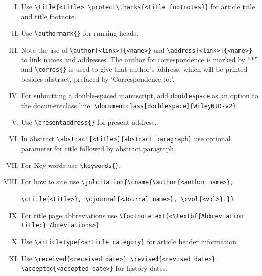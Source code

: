 \documentclass[ACS,STIX1COL]{WileyNJD-v2}
\begin{document}
\begin{enumerate}[(I).]

\item Use \verb"\title{<title> \protect\thanks{<title footnotes}}" for article title and title footnote.
\item Use \verb"\authormark{}" for running heads.

\item Note the use of \verb"\author[<link>]{<name>}" and \verb"\address[<link>]{<name>}" to
link names and addresses. The author for correspondence is marked
by ``*'' and \verb"\corres{}" is used to give that
author's address, which will be printed besides abstract, prefaced by
`Correspondence to:'.

\item For submitting a double-spaced manuscript, add
\verb"doublespace" as an option to the documentclass line. \verb"\documentclass[doublespace]{WileyNJD-v2}"

\item Use \verb"\presentaddress{}" for present address.

\item In abstract \verb"\abstract[<title>]{abstract paragraph}" use optional parameter for title followed by abstract paragraph.

\item For Key words use \verb"\keywords{}".

\item For how to site use \verb"\jnlcitation{\cname{\author{<author name>},"

\verb"\ctitle{<title>}, \cjournal{<Journal name>}, \cvol{<vol>}.}}".

\item For title page abbreviations use \verb"\footnotetext{<\textbf{Abbreviation title:} Abreviations>}"

\item Use \verb"\articletype{<article category}" for article header information

\item Use \verb"\received{<received date>} \revised{<revised date>} \accepted{<accepted date>}" for history dates.

\end{enumerate}
\end{document}
